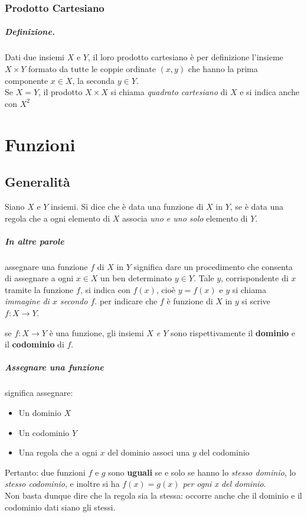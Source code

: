 \documentclass[12pt, a4paper, openany]{book}
\newcommand{\definizione}[1]{\begin{box_definizione} #1 \end{box_definizione}}
\begin{document}
\subsection*{Prodotto Cartesiano}
\paragraph{Definizione.}Dati due insiemi $X$ e $Y$, il loro prodotto cartesiano è per definizione l'insieme $X \times Y$ formato da tutte le coppie ordinate $(x,y)$ che hanno la prima componente $x \in X$, la seconda $y \in Y$.\\
Se $X = Y$, il prodotto $X \times X$ si chiama \emph{quadrato cartesiano} di $X$ e si indica anche con $X^2$

\chapter{Funzioni}

\section{Generalità}
\definizione{
    Siano $X$ e $Y$ insiemi. Si dice che è data una funzione di $X$ in $Y$, se è data una regola che a ogni elemento di $X$ associa \emph{uno e uno solo} elemento di $Y$.
}
\paragraph{In altre parole} assegnare una funzione $f$ di $X$ in $Y$ significa dare un procedimento che consenta di assegnare a ogni $x \in X$ un ben determinato $y \in Y$. Tale $y$, corrispondente di $x$ tramite la funzione $f$, si indica con $f(x)$, cioè $y = f(x)$ e $y$ si chiama \emph{immagine di $x$ secondo $f$}. per indicare che $f$ è funzione di $X$ in $y$ si scrive $f: X \rightarrow Y$.

\definizione{
    se $f: X \rightarrow Y$ è una funzione, gli insiemi \emph{$X$ e $Y$} sono rispettivamente il \textbf{dominio} e il \textbf{codominio} di $f$.
}
\paragraph{Assegnare una funzione} significa assegnare:
\begin{itemize}
    \item Un dominio $X$
    \item Un codominio $Y$
    \item Una regola che a ogni $x$ del dominio associ una $y$ del codominio
\end{itemize}
Pertanto: due funzioni $f$ e $g$ sono \textbf{uguali} se e solo se hanno lo \emph{stesso dominio}, lo\emph{ stesso codominio}, e inoltre si ha \emph{$f(x) = g(x)$ per ogni x del dominio}.\\
Non basta dunque dire che la regola sia la stessa: occorre anche che il dominio e il codominio dati siano gli stessi.
\end{document}
